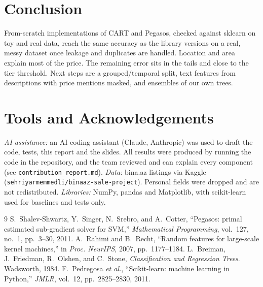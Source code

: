 \documentclass[10pt,twocolumn,a4paper]{article}
\begin{document}
\section{Conclusion}
From-scratch implementations of CART and Pegasos, checked against sklearn on toy and real data, reach the
same accuracy as the library versions on a real, messy dataset once leakage and duplicates are handled. Location
and area explain most of the price. The remaining error sits in the tails and close to the tier threshold.
Next steps are a grouped/temporal split, text features from descriptions with price mentions masked,
and ensembles of our own trees.

\section*{Tools and Acknowledgements}
\emph{AI assistance:} an AI coding assistant (Claude, Anthropic) was used to draft the code, tests,
this report and the slides. All results were produced by running the code in the repository, and the team
reviewed and can explain every component (see \texttt{contribution\_report.md}).
\emph{Data:} bina.az listings via Kaggle (\texttt{sehriyarmemmedli/binaaz-sale-project}). Personal fields were
dropped and are not redistributed. \emph{Libraries:} NumPy, pandas and Matplotlib, with scikit-learn used for baselines and tests only.

\begin{thebibliography}{9}
S.~Shalev-Shwartz, Y.~Singer, N.~Srebro, and A.~Cotter,
``Pegasos: primal estimated sub-gradient solver for SVM,''
\emph{Mathematical Programming}, vol.~127, no.~1, pp.~3--30, 2011.
A.~Rahimi and B.~Recht, ``Random features for large-scale kernel machines,''
in \emph{Proc. NeurIPS}, 2007, pp.~1177--1184.
L.~Breiman, J.~Friedman, R.~Olshen, and C.~Stone, \emph{Classification and Regression Trees}.
Wadsworth, 1984.
F.~Pedregosa \emph{et al.}, ``Scikit-learn: machine learning in Python,''
\emph{JMLR}, vol.~12, pp.~2825--2830, 2011.
\end{thebibliography}
\end{document}
